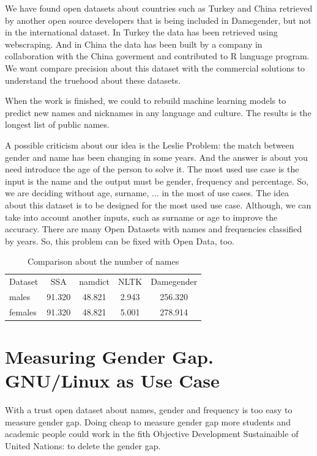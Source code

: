 \documentclass[a4paper]{article}
\begin{document}
We have found open datasets about countries such as Turkey and China
retrieved by another open source developers that is being included in
Damegender, but not in the international dataset. In Turkey the data
has been retrieved using webscraping. And in China the data has been
built by a company in collaboration with the China goverment and
contributed to R language program. We want compare precision about
this dataset with the commercial solutions to understand the truehood
about these datasets.

When the work is finished, we could to rebuild machine learning models
to predict new names and nicknames in any language and culture. The
results is the longest list of public names.

A possible criticism about our idea is the Leslie
Problem\cite{blevins2015jane}: the match between gender and name has
been changing in some years. And the answer is about you need
introduce the age of the person to solve it. The most used use case is
the input is the name and the output must be gender, frequency and
percentage. So, we are deciding without age, surname, ... in the most
of use cases. The idea about this dataset is to be designed for the
most used use case. Although, we can take into account another inputs,
such as surname or age to improve the accuracy. There are many Open
Datasets with names and frequencies classified by years. So, this
problem can be fixed with Open Data, too.

\begin{table}[t]
\footnotesize
\begin{tabular}[]{lcccc}
  \hline
  Dataset & SSA & namdict & NLTK & Damegender \tabularnewline
  males & 91.320 & 48.821 & 2.943 & 256.320 \tabularnewline
  females & 91.320 & 48.821 & 5.001 & 278.914 \tabularnewline
  \hline
\end{tabular}
\caption{Comparison about the number of names}
\label{table:DifferentNamesMeasures}
\end{table}


\section{Measuring Gender Gap. GNU/Linux as Use Case}
\label{sec:measuring}

With a trust open dataset about names, gender and frequency is too
easy to measure gender gap. Doing cheap to measure gender gap more
students and academic people could work in the fith Objective
Development Sustainaible of United Nations: to delete the gender gap.
\end{document}
